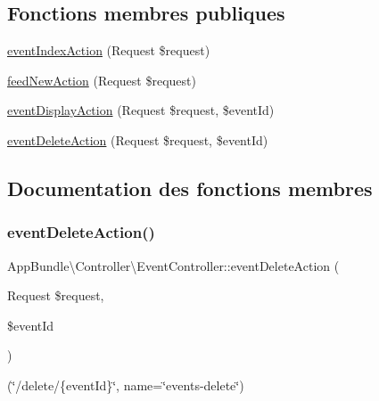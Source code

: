 \subsection*{Fonctions membres publiques}
\begin{DoxyCompactItemize}
\item 
\hyperlink{classAppBundle_1_1Controller_1_1EventController_a411287cd2df1b0571ac661d44a96b4be}{event\+Index\+Action} (Request \$request)
\item 
\hyperlink{classAppBundle_1_1Controller_1_1EventController_a31fbe84d7d41895928d28d9caca6cb07}{feed\+New\+Action} (Request \$request)
\item 
\hyperlink{classAppBundle_1_1Controller_1_1EventController_acd1acbb789cf2c9f5e4c9ba3e4b9e23f}{event\+Display\+Action} (Request \$request, \$event\+Id)
\item 
\hyperlink{classAppBundle_1_1Controller_1_1EventController_ad957c92b26d4d3bfbe4363f3997f0bc5}{event\+Delete\+Action} (Request \$request, \$event\+Id)
\end{DoxyCompactItemize}


\subsection{Documentation des fonctions membres}
\mbox{\label{classAppBundle_1_1Controller_1_1EventController_ad957c92b26d4d3bfbe4363f3997f0bc5}} 
\subsubsection{\texorpdfstring{event\+Delete\+Action()}{eventDeleteAction()}}
{\footnotesize\ttfamily App\+Bundle\textbackslash{}\+Controller\textbackslash{}\+Event\+Controller\+::event\+Delete\+Action (\begin{DoxyParamCaption}\item[{Request}]{\$request,  }\item[{}]{\$event\+Id }\end{DoxyParamCaption})}

(\char`\"{}/delete/\{event\+Id\}\char`\"{}, name=\char`\"{}events-\/delete\char`\"{}) \mbox{\label{classAppBundle_1_1Controller_1_1EventController_acd1acbb789cf2c9f5e4c9ba3e4b9e23f}} 
